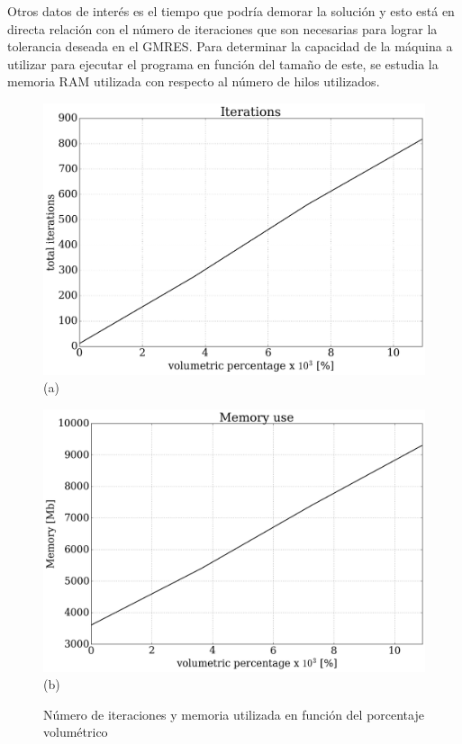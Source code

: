 \documentclass[12pt,letterpaper]{article}
\numberwithin{equation}{section}
\begin{document}
Otros datos de interés es el tiempo que podría demorar la solución y esto está en directa relación con el número de iteraciones que son necesarias para lograr la tolerancia deseada en el GMRES. Para determinar la capacidad de la máquina a utilizar para ejecutar el programa en función del tamaño de este, se estudia la memoria RAM utilizada con respecto al número de hilos utilizados.\\

\begin{figure}[H]
	\begin{minipage}{0.5\linewidth}
		\centering\includegraphics[scale=0.26]{Imagenes/itplot.png}\\
		\centering(a)
	\end{minipage}
	\hspace{5mm}
	\begin{minipage}{0.5\linewidth}
		\centering\includegraphics[scale=0.26]{Imagenes/memory.png}\\
		\centering(b)
	\end{minipage}
	\caption{Número de iteraciones y memoria utilizada en función del porcentaje volumétrico}
	\label{fig:itvsnhilos}
\end{figure}
\end{document}
